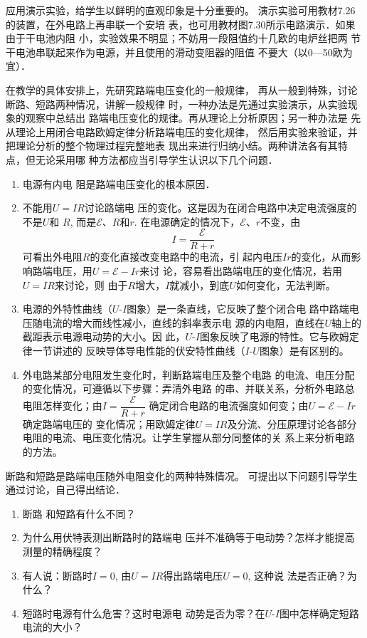 应用演示实验，给学生以鲜明的直观印象是十分重要的。
演示实验可用教材7.26的装置，在外电路上再串联一个安培
表，也可用教材图7.30所示电路演示．如果由于干电池内阻
小，实验效果不明显；不妨用一段阻值约十几欧的电炉丝把两
节干电池串联起来作为电源，并且使用的滑动变阻器的阻值
不要大（以0—50欧为宜）．

在教学的具体安排上，先研究路端电压变化的一般规律，
再从一般到特殊，讨论断路、短路两种情况，讲解一般规律
时，一种办法是先通过实验演示，从实验现象的观察中总结出
路端电压变化的规律。再从理论上分析原因；另一种办法是
先从理论上用闭合电路欧姆定律分析路端电压的变化规律，
然后用实验来验证，并把理论分析的整个物理过程完整地表
现出来进行归纳小结。两种讲法各有其特点，但无论采用哪
种方法都应当引导学生认识以下几个问题．
\begin{enumerate}
\item 电源有内电
阻是路端电压变化的根本原因．
\item 不能用$U=IR$讨论路端电
压的变化。这是因为在闭合电路中决定电流强度的不是$U$和
$R$, 而是$\mathcal{E}$、$R$和$r$. 在电源确定的情况下，$\mathcal{E}$、$r$不变，由
\[I=\frac{\mathcal{E}}{R+r}\]
可看出外电阻$R$的变化直接改变电路中的电流，引
起内电压$Ir$的变化，从而影响路端电压，用$U=\mathcal{E}-Ir$来讨
论，容易看出路端电压的变化情况，若用$U=IR$来讨论，则
由于$R$增大，$I$就减小，到底$U$如何变化，无法判断。

\item 电源的外特性曲线（$U$-$I$图象）是一条直线，它反映了整个闭合电
路中路端电压随电流的增大而线性减小，直线的斜率表示电
源的内电阻，直线在$U$轴上的截距表示电源电动势的大小。因
此，$U$-$I$图象反映了电源的特性。它与欧姆定律一节讲述的
反映导体导电性能的伏安特性曲线（$I$-$U$图象）是有区别的。
\item 外电路某部分电阻发生变化时，判断路端电压及整个电路
的电流、电压分配的变化情况，可遵循以下步骤：弄清外电路
的串、并联关系，分析外电路总电阻怎样变化；由$I=\dfrac{\mathcal{E}}{R+r}$
确定闭合电路的电流强度如何变；由$U=\mathcal{E}-Ir$确定路端电压的
变化情况；用欧姆定律$U=IR$及分流、分压原理讨论各部分
电阻的电流、电压变化情况。让学生掌握从部分同整体的关
系上来分析电路的方法。
\end{enumerate}



断路和短路是路端电压随外电阻变化的两种特殊情况。
可提出以下问题引导学生通过讨论，自己得出结论．
\begin{enumerate}
\item 断路
和短路有什么不同？
\item 为什么用伏特表测出断路时的路端电
压并不准确等于电动势？怎样才能提高测量的精确程度？
\item 
有人说：断路时$I=0$, 由$U=IR$得出路端电压$U=0$, 这种说
法是否正确？为什么？
\item 短路时电源有什么危害？这时电源电
动势是否为零？在$U$-$I$图中怎样确定短路电流的大小？
\end{enumerate}


